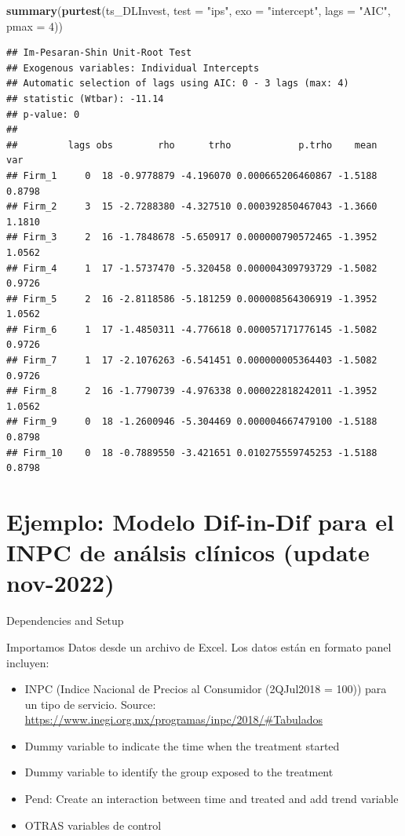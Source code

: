 \documentclass[
]{book}
\newenvironment{Shaded}{\begin{snugshade}}{\end{snugshade}}
\newcommand{\AttributeTok}[1]{\textcolor[rgb]{0.13,0.29,0.53}{#1}}
\newcommand{\DecValTok}[1]{\textcolor[rgb]{0.00,0.00,0.81}{#1}}
\newcommand{\FunctionTok}[1]{\textcolor[rgb]{0.13,0.29,0.53}{\textbf{#1}}}
\newcommand{\NormalTok}[1]{#1}
\newcommand{\StringTok}[1]{\textcolor[rgb]{0.31,0.60,0.02}{#1}}
\begin{document}
\begin{Shaded}
\begin{Highlighting}[]
\FunctionTok{summary}\NormalTok{(}\FunctionTok{purtest}\NormalTok{(ts\_DLInvest, }\AttributeTok{test =} \StringTok{"ips"}\NormalTok{, }\AttributeTok{exo =} \StringTok{"intercept"}\NormalTok{, }
                \AttributeTok{lags =} \StringTok{"AIC"}\NormalTok{, }\AttributeTok{pmax =} \DecValTok{4}\NormalTok{))}
\end{Highlighting}
\end{Shaded}

\begin{verbatim}
## Im-Pesaran-Shin Unit-Root Test 
## Exogenous variables: Individual Intercepts 
## Automatic selection of lags using AIC: 0 - 3 lags (max: 4)
## statistic (Wtbar): -11.14 
## p-value: 0 
## 
##         lags obs        rho      trho            p.trho    mean    var
## Firm_1     0  18 -0.9778879 -4.196070 0.000665206460867 -1.5188 0.8798
## Firm_2     3  15 -2.7288380 -4.327510 0.000392850467043 -1.3660 1.1810
## Firm_3     2  16 -1.7848678 -5.650917 0.000000790572465 -1.3952 1.0562
## Firm_4     1  17 -1.5737470 -5.320458 0.000004309793729 -1.5082 0.9726
## Firm_5     2  16 -2.8118586 -5.181259 0.000008564306919 -1.3952 1.0562
## Firm_6     1  17 -1.4850311 -4.776618 0.000057171776145 -1.5082 0.9726
## Firm_7     1  17 -2.1076263 -6.541451 0.000000005364403 -1.5082 0.9726
## Firm_8     2  16 -1.7790739 -4.976338 0.000022818242011 -1.3952 1.0562
## Firm_9     0  18 -1.2600946 -5.304469 0.000004667479100 -1.5188 0.8798
## Firm_10    0  18 -0.7889550 -3.421651 0.010275559745253 -1.5188 0.8798
\end{verbatim}

\hypertarget{ejemplo-modelo-dif-in-dif-para-el-inpc-de-anuxe1lsis-cluxednicos-update-nov-2022}{%
\section{Ejemplo: Modelo Dif-in-Dif para el INPC de análsis clínicos (update nov-2022)}\label{ejemplo-modelo-dif-in-dif-para-el-inpc-de-anuxe1lsis-cluxednicos-update-nov-2022}}

Dependencies and Setup

Importamos Datos desde un archivo de Excel. Los datos están en formato panel incluyen:

\begin{itemize}
\item
  INPC (Indice Nacional de Precios al Consumidor (2QJul2018 = 100)) para un tipo de servicio. Source: \url{https://www.inegi.org.mx/programas/inpc/2018/\#Tabulados}
\item
  Dummy variable to indicate the time when the treatment started
\item
  Dummy variable to identify the group exposed to the treatment
\item
  Pend: Create an interaction between time and treated and add trend variable
\item
  OTRAS variables de control
\end{itemize}
\end{document}
